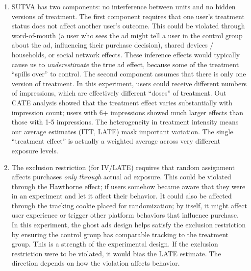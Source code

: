 \documentclass[10pt]{article}
\begin{document}
\begin{enumerate}
\begin{enumerate}
        Our inference relies on asymptotic approximations with robust standard errors to account for heteroskedasticity, which is particularly important for binary outcomes where variance inherently depends on the mean. With 50k observations, large-sample approximations are generally reliable. However, our standard errors do not account for potential clustering --- if users share devices or households, observations may not be independent, and cluster-robust standard errors would be more appropriate. 
        \newpage 
        \item SUTVA has two components: no interference between units and no hidden versions of treatment. The first component requires that one user's treatment status does not affect another user's outcome. This could be violated through word-of-mouth (a user who sees the ad might tell a user in the control group about the ad, influencing their purchase decision), shared devices / households, or social network effects. These inference effects would typically cause us to \textit{underestimate} the true ad effect, because some of the treatment ``spills over'' to control. The second component assumes that there is only one version of treatment. In this experiment, users could receive different numbers of impressions, which are effectively different ``doses'' of treatment. Out CATE analysis showed that the treatment effect varies substantially with impression count; users with 6+ impressions showed much larger effects than those with 1-5 impressions. The heterogeneity in treatment intensity means our average estimates (ITT, LATE) mask important variation. The single ``treatment effect'' is actually a weighted average across very different exposure levels. 

        \item The exclusion restriction (for IV/LATE) requires that random assignment affects purchases \textit{only through} actual ad exposure. This could be violated through the Hawthorne effect; if users somehow became aware that they were in an experiment and let it affect their behavior. It could also be affected through the tracking cookie placed for randomization; by itself, it might affect user experience or trigger other platform behaviors that influence purchase. In this experiment, the ghost ads design helps satisfy the exclusion restriction by ensuring the control group has comparable tracking to the treatment group. This is a strength of the experimental design. If the exclusion restriction were to be violated, it would bias the LATE estimate. The direction depends on how the violation affects behavior. 


\end{enumerate}
\end{enumerate}
\end{document}
